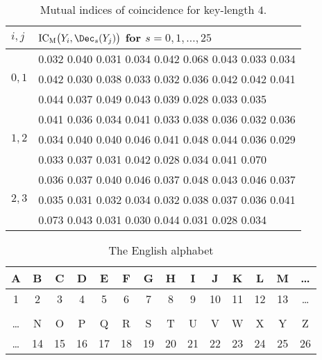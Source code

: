 \documentclass{practice}
\DeclareMathOperator*{\IC}{IC}
\DeclareMathOperator*{\mIC}{\IC_M}
\begin{document}
\begin{table}
  \centering
  \begin{tabular}{@{}l l@{}}
    $i, j$ & $\mIC\bigl(Y_i, \Dec_s(Y_j)\bigr)$ for $s = 0, 1, \dots, 25$\\
    \midrule
    \multirow{3}{*}{$0, 1$} &
      0.032 0.040 0.031 0.034 0.042 0.068 0.043 0.033 0.034\\
      &
      0.042 0.030 0.038 0.033 0.032 0.036 0.042 0.042 0.041\\
      &
      0.044 0.037 0.049 0.043 0.039 0.028 0.033 0.035\\\midrule
    \multirow{3}{*}{$1, 2$} &
      0.041 0.036 0.034 0.041 0.033 0.038 0.036 0.032 0.036\\
      &
      0.034 0.040 0.040 0.046 0.041 0.048 0.044 0.036 0.029\\
      &
      0.033 0.037 0.031 0.042 0.028 0.034 0.041 0.070\\\midrule
    \multirow{3}{*}{$2, 3$} &
      0.036 0.037 0.040 0.046 0.037 0.048 0.043 0.046 0.037\\
      &
      0.035 0.031 0.032 0.034 0.032 0.038 0.037 0.036 0.041\\
      &
      0.073 0.043 0.031 0.030 0.044 0.031 0.028 0.034\\\midrule
  \end{tabular}
  \caption{Mutual indices of coincidence for key-length $4$.}
  \label{table:mICs}
\end{table}

\begin{table}
  \centering
  \begin{tabular}{@{}cccccccccccccc@{}}
    A  & B  & C  & D  & E  & F  & G  & H  & I  & J  & K  & L  & M & \dots\\\midrule
    1  & 2  & 3  & 4  & 5  & 6  & 7  & 8  & 9  & 10 & 11 & 12 & 13 & \dots\\\\
    \dots & N  & O  & P  & Q  & R  & S  & T  & U  & V  & W  & X  & Y  & Z\\\midrule
    \dots & 14 & 15 & 16 & 17 & 18 & 19 & 20 & 21 & 22 & 23 & 24 & 25 & 26
  \end{tabular}
  \caption{The English alphabet}
  \label{table:alphabet}
\end{table}

\newpage
\end{document}
